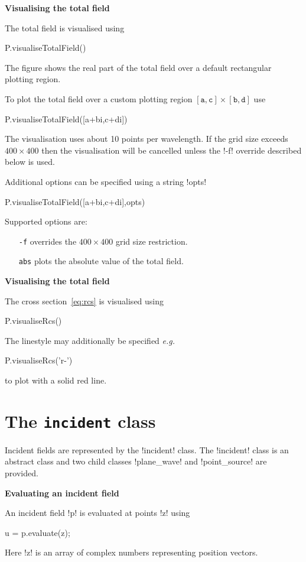 \documentclass[11pt,letterpaper]{article}
\newcommand{\eg}{{\em e.g.}}
\newcommand{\techheading}[1]{%
    \par\vspace{-0.3\parskip}\noindent\hspace{-1cm}\textbf{#1}%
    \par\vspace{-0.5\parskip}\noindent\nopagebreak\ignorespaces}
\begin{document}
\techheading{Visualising the total field}
The total field is visualised using
\begin{matlab}
P.visualiseTotalField()
\end{matlab}
The figure shows the real part of the total field over a default
rectangular plotting region.

To plot the total field over a custom plotting region
$[\texttt{a},\texttt{c}] \times [\texttt{b},\texttt{d}]$
use
\begin{matlab}
P.visualiseTotalField([a+bi,c+di])
\end{matlab}
The visualisation uses about 10 points per wavelength.
If the grid size exceeds $400 \times 400$ then the visualisation
will be cancelled unless the !-f! override described below is used.

Additional options can be specified using a string !opts!
\begin{matlab}
P.visualiseTotalField([a+bi,c+di],opts)
\end{matlab}
Supported options are:
\begin{itemize}
\item[\texttt{-f}] overrides the $400 \times 400$ grid size restriction.
\item[\texttt{abs}] plots the absolute value of the total field.
\end{itemize}
      
\techheading{Visualising the total field}
The cross section~\eqref{eq:rcs} is visualised using
\begin{matlab}
P.visualiseRcs()
\end{matlab}
The linestyle may additionally be specified \eg{}
\begin{matlab}
P.visualiseRcs('r-')
\end{matlab}
to plot with a solid red line.

\section{The \texttt{incident} class}

Incident fields are represented by the !incident! class.
The !incident! class is an abstract class and two child classes
!plane_wave! and !point_source! are provided.

\techheading{Evaluating an incident field}
An incident field !p! is evaluated at points !z! using
\begin{matlab}
u = p.evaluate(z);
\end{matlab}
Here !z! is an array of complex numbers representing position vectors.
\end{document}
